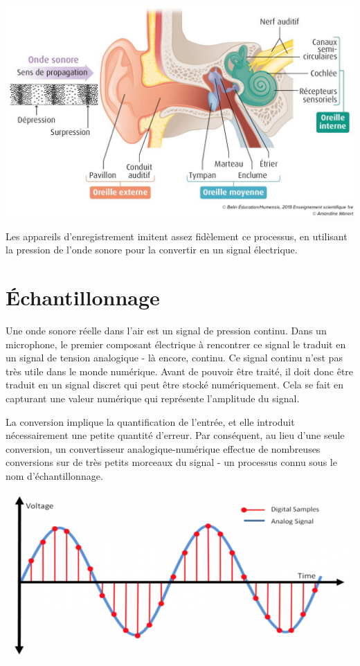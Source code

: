 \documentclass[11pt, report, french]{scrreprt}
\begin{document}
\begin{center}
	\includegraphics[scale=0.35]{img/sys_auditif.jpg}
\end{center}

Les appareils d'enregistrement imitent assez fidèlement ce processus, en utilisant la pression de l'onde sonore pour la convertir en un signal électrique. \\

\section{Échantillonnage}
Une onde sonore réelle dans l'air est un signal de pression continu. Dans un microphone, le premier composant électrique à rencontrer ce signal le traduit en un signal de tension analogique - là encore, continu. Ce signal continu n'est pas très utile dans le monde numérique. Avant de pouvoir être traité, il doit donc être traduit en un signal discret qui peut être stocké numériquement. Cela se fait en capturant une valeur numérique qui représente l'amplitude du signal.\\\par

La conversion implique la quantification de l'entrée, et elle introduit nécessairement une petite quantité d'erreur. Par conséquent, au lieu d'une seule conversion, un convertisseur analogique-numérique effectue de nombreuses conversions sur de très petits morceaux du signal - un processus connu sous le nom d'échantillonnage.

\begin{center}
	\includegraphics[scale=0.3]{img/sampling.png}
\end{center}
\end{document}
